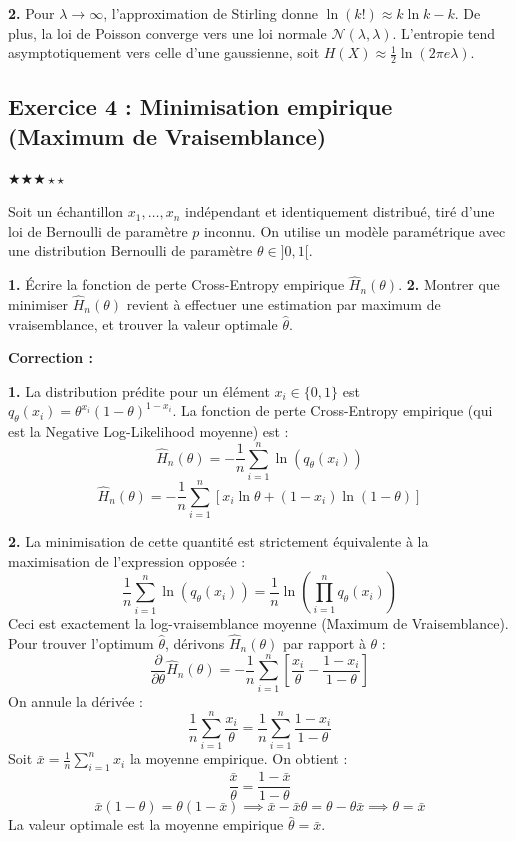 \documentclass[11pt,a4paper]{article}
\begin{document}
\textbf{2.} Pour $\lambda \to \infty$, l'approximation de Stirling donne $\ln(k!) \approx k \ln k - k$. De plus, la loi de Poisson converge vers une loi normale $\mathcal{N}(\lambda, \lambda)$. L'entropie tend asymptotiquement vers celle d'une gaussienne, soit $H(X) \approx \frac{1}{2} \ln(2\pi e \lambda)$.


\subsection*{Exercice 4 : Minimisation empirique (Maximum de Vraisemblance) }

$\bigstar\bigstar\bigstar\star\star$


Soit un échantillon $x_1, \dots, x_n$ indépendant et identiquement distribué, tiré d'une loi de Bernoulli de paramètre $p$ inconnu. On utilise un modèle paramétrique avec une distribution Bernoulli de paramètre $\theta \in ]0, 1[$.

\textbf{1.} Écrire la fonction de perte Cross-Entropy empirique $\hat{H}_n(\theta)$.
\textbf{2.} Montrer que minimiser $\hat{H}_n(\theta)$ revient à effectuer une estimation par maximum de vraisemblance, et trouver la valeur optimale $\hat{\theta}$.

\textbf{Correction :}

\textbf{1.} La distribution prédite pour un élément $x_i \in \{0, 1\}$ est $q_\theta(x_i) = \theta^{x_i}(1-\theta)^{1-x_i}$.
La fonction de perte Cross-Entropy empirique (qui est la Negative Log-Likelihood moyenne) est :
$$\hat{H}_n(\theta) = - \frac{1}{n} \sum_{i=1}^n \ln(q_\theta(x_i))$$
$$\hat{H}_n(\theta) = - \frac{1}{n} \sum_{i=1}^n [x_i \ln \theta + (1-x_i) \ln(1-\theta)]$$

\textbf{2.} La minimisation de cette quantité est strictement équivalente à la maximisation de l'expression opposée :
$$\frac{1}{n} \sum_{i=1}^n \ln(q_\theta(x_i)) = \frac{1}{n} \ln \left( \prod_{i=1}^n q_\theta(x_i) \right)$$
Ceci est exactement la log-vraisemblance moyenne (Maximum de Vraisemblance).
Pour trouver l'optimum $\hat{\theta}$, dérivons $\hat{H}_n(\theta)$ par rapport à $\theta$ :
$$\frac{\partial}{\partial \theta} \hat{H}_n(\theta) = - \frac{1}{n} \sum_{i=1}^n \left[ \frac{x_i}{\theta} - \frac{1-x_i}{1-\theta} \right]$$
On annule la dérivée :
$$ \frac{1}{n} \sum_{i=1}^n \frac{x_i}{\theta} = \frac{1}{n} \sum_{i=1}^n \frac{1-x_i}{1-\theta}$$
Soit $\bar{x} = \frac{1}{n} \sum_{i=1}^n x_i$ la moyenne empirique. On obtient :
$$\frac{\bar{x}}{\theta} = \frac{1-\bar{x}}{1-\theta}$$
$$\bar{x}(1-\theta) = \theta(1-\bar{x}) \implies \bar{x} - \bar{x}\theta = \theta - \theta\bar{x} \implies \theta = \bar{x}$$
La valeur optimale est la moyenne empirique $\hat{\theta} = \bar{x}$.
\end{document}
